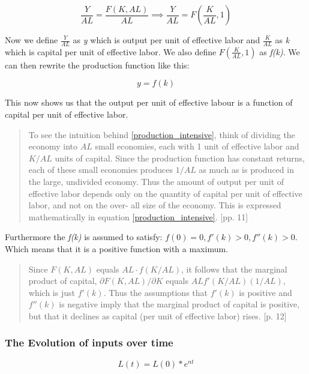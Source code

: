 \begin{equation*}
\frac{Y}{AL}=\frac{F(K,AL)}{AL}\implies\frac{Y}{AL}=F(\frac{K}{AL},1)
\end{equation*}

Now we define $\frac{Y}{AL}$ as \textit{y} which is output per unit of effective labor and $\frac{K}{AL}$ as \textit{k} which is capital per unit of effective labor. We also define $F(\frac{K}{AL},1)$ as \textit{f(k)}. We can then rewrite the production function like this:

\begin{equation}\label{production_intensive}
y=f(k)
\end{equation}

This now shows us that the output per unit of effective labour is a function of capital per unit of effective labor. 

\begin{quotation}
To see the intuition behind \ref{production_intensive}, think of dividing the economy into $AL$ small economies, each with 1 unit of effective labor and $K/AL$ units of capital. Since the production function has constant returns, each of these small economies produces $1/AL$ as much as is produced in the large, undivided economy. Thus the amount of output per unit of effective labor depends only on the quantity of capital per unit of effective labor, and not on the over- all size of the economy. This is expressed mathematically in equation \ref{production_intensive}. \textcite{romer_advanced_2012}[pp. 11]
\end{quotation}

Furthermore the \textit{f(k)} is assumed to satisfy: $f(0)=0, f'(k)>0, f''(k) > 0$. Which means that it is a positive function with a maximum. 

\begin{quotation}
Since $F(K,AL)$ equals $AL \cdot f (K/AL)$, it follows that the marginal product of capital, $\partial F(K,AL)/ \partial K$ equals $ALf'(K/AL)(1/AL)$, which is just $f '(k)$. Thus the assumptions that $f '(k)$ is positive and $f ''(k)$ is negative imply that the marginal product of capital is positive, but that it declines as capital (per unit of effective labor) rises. \textcite{romer_advanced_2012}[p. 12]
\end{quotation}

\subsubsection*{The Evolution of inputs over time}
\begin{equation*}
L(t)=L(0)*e^{nt}
\end{equation*}

